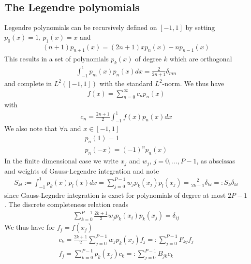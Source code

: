 \documentclass[a4paper,12pt]{scrartcl}
\begin{document}
\subsection{ The Legendre polynomials}
Legendre polynomials can be recursively defined on $[-1,1]$ by setting
$p_0(x) = 1$, $p_1(x) = x$ and
\begin{align}
    (n+1)p_{n+1}(x) = (2n+1)xp_n(x) - np_{n-1}(x)
    \label{eq:recursion}
\end{align}
This results in a set of polynomials $p_k(x)$ of degree $k$ which are orthogonal
\begin{align}
    \int_{-1}^{1} p_m(x)p_n(x) dx = \frac{2}{2n+1}\delta_{mn} 
    \label{eq:orthogonal}
\end{align}
and complete in $L^2([-1,1])$ with the standard $L^2$-norm. We thus have
\begin{align}
    f(x) = \sum_{n=0}^\infty c_n p_n(x)
    \label{eq:expansion}
\end{align} with
\begin{align}
    c_n = \frac{2n+1}{2}\int_{-1}^{1} f(x)p_n(x)dx
    \label{eq:coefficient}
\end{align}
We also note that $\forall n$ and $x\in[-1,1]$
\begin{subequations}
\begin{align}
    p_n(1) = 1 \\
    p_n(-x) = (-1)^np_n(x)
\end{align}
\label{eq:boundaries}
\end{subequations}
In the finite dimensional case we write 
$x_j$ and $w_j$, $j=0,\dots,P-1$, as abscissas and weights of 
Gauss-Legendre integration and note
\begin{align}
    S_{kl} := \int_{-1}^1 p_k(x)p_l(x) dx = \sum_{j=0}^{P-1} w_jp_k (x_j)p_l(x_j) = \frac{2}{2k+1}\delta_{kl} =: S_k \delta_{kl}
    \label{}
\end{align}
since Gauss-Legndre integration is exact for polynomials of degree at most $2P-1$.
The discrete completeness relation reads
\begin{align}
    \sum_{k=0}^{P-1} \frac{2k+1}{2}w_j p_k(x_i)p_k(x_j) = \delta_{ij} 
    \label{}
\end{align}
We thus have for $f_j = f(x_j)$
\begin{subequations}
\begin{align}
    c_k = \frac{2k+1}{2}\sum_{j=0}^{P-1}w_j p_k(x_j) f_j =: \sum_{j=0}^{P-1} F_{kj}f_j\\
    f_j = \sum_{k=0}^{P-1} p_k(x_j) c_k =: \sum_{j=0}^{P-1} B_{jk}c_k
\end{align}
\end{subequations}
\end{document}
